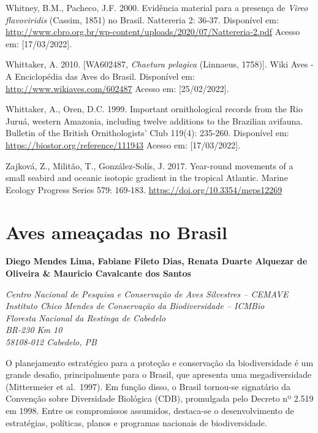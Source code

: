 \documentclass[
  oneside]{scrbook}
\begin{document}
Whitney, B.M., Pacheco, J.F. 2000. Evidência material para a presença de \emph{Vireo flavoviridis} (Cassim, 1851) no Brasil. Nattereria 2: 36‑37. Disponível em: \url{http://www.cbro.org.br/wp-content/uploads/2020/07/Nattereria-2.pdf} Acesso em: {[}17/03/2022{]}.

Whittaker, A. 2010. {[}WA602487, \emph{Chaetura pelagica} (Linnaeus, 1758){]}. Wiki Aves - A Enciclopédia das Aves do Brasil. Disponível em: \url{http://www.wikiaves.com/602487} Acesso em: {[}25/02/2022{]}.

Whittaker, A., Oren, D.C. 1999. Important ornithological records from the Rio Juruá, western Amazonia, including twelve additions to the Brazilian avifauna. Bulletin of the British Ornithologists' Club 119(4): 235‑260. Disponível em: \url{https://biostor.org/reference/111943} Acesso em: {[}17/03/2022{]}.

Zajková, Z., Militão, T., González-Solís, J. 2017. Year-round movements of a small seabird and oceanic isotopic gradient in the tropical Atlantic. Marine Ecology Progress Series 579: 169‑183. \url{https://doi.org/10.3354/meps12269}

\hypertarget{cap3}{%
\chapter{Aves ameaçadas no Brasil}\label{cap3}}

\pagestyle{headings}

\textbf{Diego Mendes Lima, Fabiane Fileto Dias, Renata Duarte Alquezar de Oliveira \& Mauricio Cavalcante dos Santos}

\emph{Centro Nacional de Pesquisa e Conservação de Aves Silvestres -- CEMAVE}\\
\emph{Instituto Chico Mendes de Conservação da Biodiversidade -- ICMBio}\\
\emph{Floresta Nacional da Restinga de Cabedelo}\\
\emph{BR-230 Km 10}\\
\emph{58108-012 Cabedelo, PB}

O planejamento estratégico para a proteção e conservação da biodiversidade é um grande desafio, principalmente para o Brasil, que apresenta uma megadiversidade (Mittermeier et al.~1997). Em função disso, o Brasil tornou-se signatário da Convenção sobre Diversidade Biológica (CDB), promulgada pelo Decreto nº 2.519 em 1998. Entre os compromissos assumidos, destaca-se o desenvolvimento de estratégias, políticas, planos e programas nacionais de biodiversidade.
\end{document}
